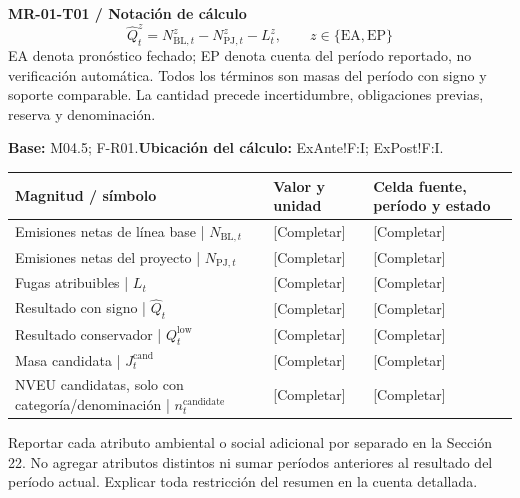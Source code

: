 \par\begingroup\sffamily\fontsize{8.4}{10.5}\selectfont\color{NEBGreen}
\textbf{MR-01-T01 / Notación de cálculo}\
{\fontsize{10}{12}\selectfont\[\widehat Q_t^z=N_{\mathrm{BL},t}^z-N_{\mathrm{PJ},t}^z-L_t^z,\qquad z\in\{\mathrm{EA},\mathrm{EP}\}\]}
EA denota pronóstico fechado; EP denota cuenta del período reportado, no verificación automática. Todos los términos son masas del período con signo y soporte comparable. La cantidad precede incertidumbre, obligaciones previas, reserva y denominación.\par
\textbf{Base:} M04.5; F-R01.\quad\textbf{Ubicación del cálculo:} ExAnte!F:I; ExPost!F:I.\par\endgroup
{\sffamily\fontsize{8.6}{10.7}\selectfont\begin{longtable}{@{}P{48mm}P{61mm}P{53mm}@{}}
\toprule
\textbf{Magnitud / símbolo} & \textbf{Valor y unidad} & \textbf{Celda fuente, período y estado}\\\midrule\endhead
\rule{0pt}{8mm}Emisiones netas de línea base | $N_{\mathrm{BL},t}$ & [Completar] & [Completar]\\\hline
\rule{0pt}{8mm}Emisiones netas del proyecto | $N_{\mathrm{PJ},t}$ & [Completar] & [Completar]\\\hline
\rule{0pt}{8mm}Fugas atribuibles | $L_t$ & [Completar] & [Completar]\\\hline
\rule{0pt}{8mm}Resultado con signo | $\widehat Q_t$ & [Completar] & [Completar]\\\hline
\rule{0pt}{8mm}Resultado conservador | $Q_t^{\mathrm{low}}$ & [Completar] & [Completar]\\\hline
\rule{0pt}{8mm}Masa candidata | $J_t^{\mathrm{cand}}$ & [Completar] & [Completar]\\\hline
\rule{0pt}{8mm}NVEU candidatas, solo con categoría/denominación | $n_t^{\mathrm{candidate}}$ & [Completar] & [Completar]\\\hline
\end{longtable}}
Reportar cada atributo ambiental o social adicional por separado en la Sección 22. No agregar atributos distintos ni sumar períodos anteriores al resultado del período actual. Explicar toda restricción del resumen en la cuenta detallada.\par
